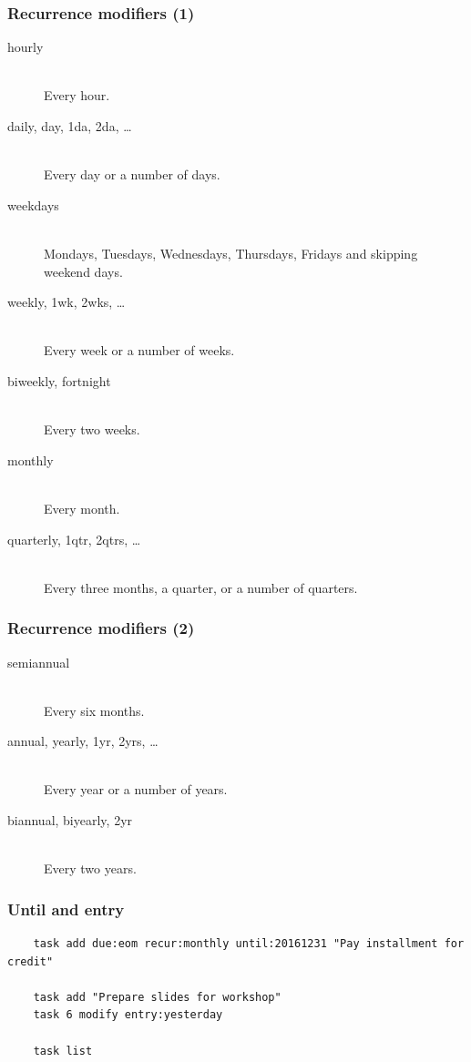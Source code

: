 \documentclass[t,handout]{beamer}
\begin{document}
\begin{frame}[fragile]\frametitle{Recurrence modifiers (1)}
    \begin{description}
        \item[hourly] \hfill \\
            Every hour.
        \item[daily, day, 1da, 2da, \ldots] \hfill \\
            Every day or a number of days.
        \item[weekdays] \hfill \\
            Mondays, Tuesdays, Wednesdays, Thursdays, Fridays and skipping weekend days.
        \item[weekly, 1wk, 2wks, \ldots] \hfill \\
            Every week or a number of weeks.
        \item[biweekly, fortnight] \hfill \\
            Every two weeks.
        \item[monthly] \hfill \\
            Every month.
        \item[quarterly, 1qtr, 2qtrs, \ldots] \hfill \\
            Every three months, a quarter, or a number of quarters.
    \end{description}
\end{frame}

\begin{frame}[fragile]\frametitle{Recurrence modifiers (2)}
    \begin{description}
        \item[semiannual] \hfill \\
            Every six months.
        \item[annual, yearly, 1yr, 2yrs, \ldots] \hfill \\
            Every year or a number of years.
        \item[biannual, biyearly, 2yr] \hfill \\
            Every two years.
    \end{description}
\end{frame}

\begin{frame}[fragile]\frametitle{Until and entry}
    \vfill
    \begin{lstlisting}
    task add due:eom recur:monthly until:20161231 "Pay installment for credit"

    task add "Prepare slides for workshop"
    task 6 modify entry:yesterday

    task list\end{lstlisting}
\end{frame}
\end{document}
